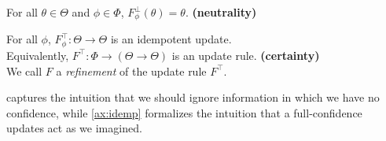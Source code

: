 \documentclass{article}
\def\cofunc{commitment function}
\def\confdom{\mathdcal C}
\begin{document}
\begin{CFaxioms}
    \item 
        For all $\theta \in \Theta$ and $\phi \in \Phi$, $F^{\bot}_\phi(\theta) = \theta$.
        \hfill \textbf{(neutrality)} \label{ax:zero}
    \item
        For all $\phi$,
        $F^\top_\phi : \Theta \to \Theta$
        is an idempotent update.\\
        Equivalently, $F^\top: \Phi \to (\Theta \to \Theta)$ is an update rule.
        \hfill \textbf{(certainty)} \label{ax:idemp}\\
        We call $F$ a \emph{refinement} of the update rule $F^\top$.
\end{CFaxioms}
 captures the intuition that we should ignore information in which we have no confidence, while \cref{ax:idemp} formalizes the intuition that a full-confidence updates act as we imagined.
\end{document}

